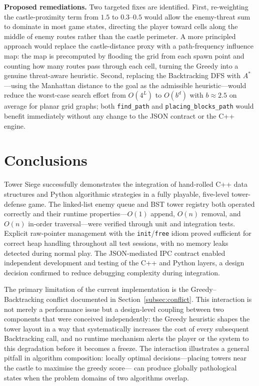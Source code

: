 \documentclass[conference]{IEEEtran}
\begin{document}
\textbf{Proposed remediations.}
Two targeted fixes are identified.
First, re-weighting the castle-proximity term from $1.5$ to $0.3$--$0.5$ would
allow the enemy-threat sum to dominate in most game states, directing the player
toward cells along the middle of enemy routes rather than the castle perimeter.
A more principled approach would replace the castle-distance proxy with a
path-frequency influence map: the map is precomputed by flooding the grid from
each spawn point and counting how many routes pass through each cell, turning
the Greedy into a genuine threat-aware heuristic.
Second, replacing the Backtracking DFS with $A^*$—using the Manhattan distance
to the goal as the admissible heuristic—would reduce the worst-case search
effort from $O(4^L)$ to $O(b^d)$ with $b \approx 2.5$ on average for planar
grid graphs; both \texttt{find\_path} and \texttt{placing\_blocks\_path} would
benefit immediately without any change to the JSON contract or the C++ engine.

\section{Conclusions}
\label{sec:conclusions}

Tower Siege successfully demonstrates the integration of hand-rolled C++ data
structures and Python algorithmic strategies in a fully playable, five-level
tower-defense game.
The linked-list enemy queue and BST tower registry both operated correctly and
their runtime properties—$O(1)$ append, $O(n)$ removal, and $O(n)$ in-order
traversal—were verified through unit and integration tests.
Explicit raw-pointer management with the \texttt{init}/\texttt{free} idiom
proved sufficient for correct heap handling throughout all test sessions, with
no memory leaks detected during normal play.
The JSON-mediated IPC contract enabled independent development and testing of
the C++ and Python layers, a design decision confirmed to reduce debugging
complexity during integration.

The primary limitation of the current implementation is the Greedy–Backtracking
conflict documented in Section~\ref{subsec:conflict}.
This interaction is not merely a performance issue but a design-level coupling
between two components that were conceived independently: the Greedy heuristic
shapes the tower layout in a way that systematically increases the cost of
every subsequent Backtracking call, and no runtime mechanism alerts the player
or the system to this degradation before it becomes a freeze.
The interaction illustrates a general pitfall in algorithm composition: locally
optimal decisions—placing towers near the castle to maximise the greedy score—
can produce globally pathological states when the problem domains of two
algorithms overlap.
\end{document}
